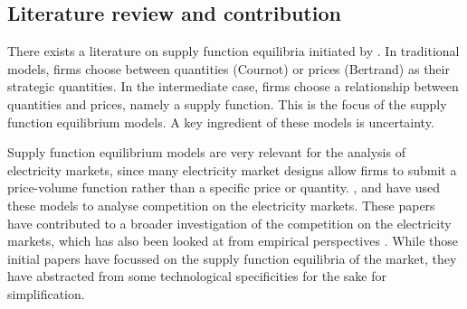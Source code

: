 \subsection{Literature review and contribution}
\label{litrev}

There exists a literature on supply function equilibria initiated by \cite{KM}. 
In traditional models, firms choose between quantities (Cournot) or prices (Bertrand) as their strategic quantities. In the intermediate case, firms choose a relationship between quantities and prices, namely a supply function. This is the focus of the supply function equilibrium models.
A key ingredient of these models is uncertainty.

Supply function equilibrium models are very relevant for the analysis of electricity markets, since many electricity market designs allow firms to submit a price-volume function rather than a specific price or quantity. \cite{Newgreen}, \cite{newbery1998competition} and \cite{bolle1992supply} have used these models to analyse competition on the electricity markets. 
These papers have contributed to a broader investigation of the competition on the electricity markets, which has also been looked at from empirical perspectives \cite{wolfram1998strategic, borensteinetal2002marketineffs}.
While those initial papers have focussed on the supply function equilibria of the market, they have abstracted from some technological specificities for the sake for simplification. 

